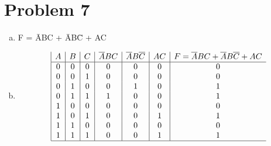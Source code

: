 \section*{Problem 7}
	\begin{enumerate}[(a)]
		\item F = \={A}BC + \={A}B\={C} + AC
		\item 
		\begin{displaymath}
		\begin{array}{|c|c|c|c|c|c|c}
		A
		& B
		& C 
		& \overline{A}BC
		& \overline{A}B\overline{C}
		& AC
		& F = \overline{A}BC + \overline{A}B\overline{C} + AC \\
		\hline
		0 & 0 & 0 & 0 & 0 & 0 & 0 \\
		0 & 0 & 1 & 0 & 0 & 0 & 0 \\
		0 & 1 & 0 & 0 & 1 & 0 & 1 \\
		0 & 1 & 1 & 1 & 0 & 0 & 1 \\
		1 & 0 & 0 & 0 & 0 & 0 & 0 \\
		1 & 0 & 1 & 0 & 0 & 1 & 1 \\
		1 & 1 & 0 & 0 & 0 & 0 & 0 \\
		1 & 1 & 1 & 0 & 0 & 1 & 1 \\
		\hline
		
		
		\end{array}
		\end{displaymath}
		
	\end{enumerate}


